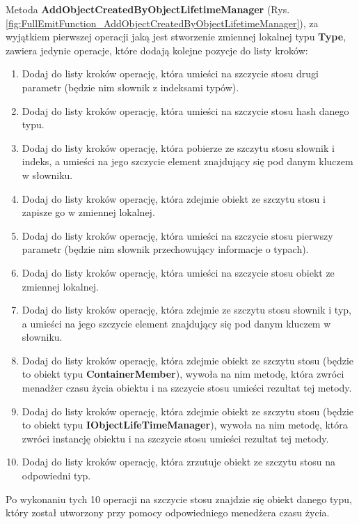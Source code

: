 \documentclass[12pt]{article}
\begin{document}
Metoda \textbf{AddObjectCreatedByObjectLifetimeManager} (Rys. \ref{fig:FullEmitFunction_AddObjectCreatedByObjectLifetimeManager}), za wyjątkiem pierwszej operacji jaką jest stworzenie zmiennej lokalnej typu \textbf{Type}, zawiera jedynie operacje, które dodają kolejne pozycje do listy kroków:
\begin{enumerate}
	\item Dodaj do listy kroków operację, która umieści na szczycie stosu drugi parametr (będzie nim słownik z indeksami typów).
	\item Dodaj do listy kroków operację, która umieści na szczycie stosu hash danego typu.
	\item Dodaj do listy kroków operację, która pobierze ze szczytu stosu słownik i indeks, a umieści na jego szczycie element znajdujący się pod danym kluczem w słowniku.
	\item Dodaj do listy kroków operację, która zdejmie obiekt ze szczytu stosu i zapisze go w zmiennej lokalnej.
	\item Dodaj do listy kroków operację, która umieści na szczycie stosu pierwszy parametr (będzie nim słownik przechowujący informacje o typach).
	\item Dodaj do listy kroków operację, która umieści na szczycie stosu obiekt ze zmiennej lokalnej.
	\item Dodaj do listy kroków operację, która zdejmie ze szczytu stosu słownik i typ, a umieści na jego szczycie element znajdujący się pod danym kluczem w słowniku.
	\item Dodaj do listy kroków operację, która zdejmie obiekt ze szczytu stosu (będzie to obiekt typu \textbf{ContainerMember}), wywoła na nim metodę, która zwróci menadżer czasu życia obiektu i na szczycie stosu umieści rezultat tej metody.
	\item Dodaj do listy kroków operację, która zdejmie obiekt ze szczytu stosu (będzie to obiekt typu \textbf{IObjectLifeTimeManager}), wywoła na nim metodę, która zwróci instancję obiektu i na szczycie stosu umieści rezultat tej metody.
	\item Dodaj do listy kroków operację, która zrzutuje obiekt ze szczytu stosu na odpowiedni typ.
\end{enumerate}
Po wykonaniu tych 10 operacji na szczycie stosu znajdzie się obiekt danego typu, który został utworzony przy pomocy odpowiedniego menedżera czasu życia.\\ \\
\end{document}
